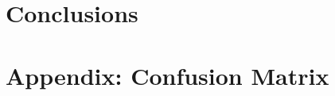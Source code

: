 \documentclass[10pt,twocolumn,letterpaper]{article}
\begin{document}

\section{Conclusions}
\label{sec:conclusion}


{\small


}

\clearpage
\appendix
\section*{Appendix: Confusion Matrix}
\label{sec:appendix}

\end{document}
